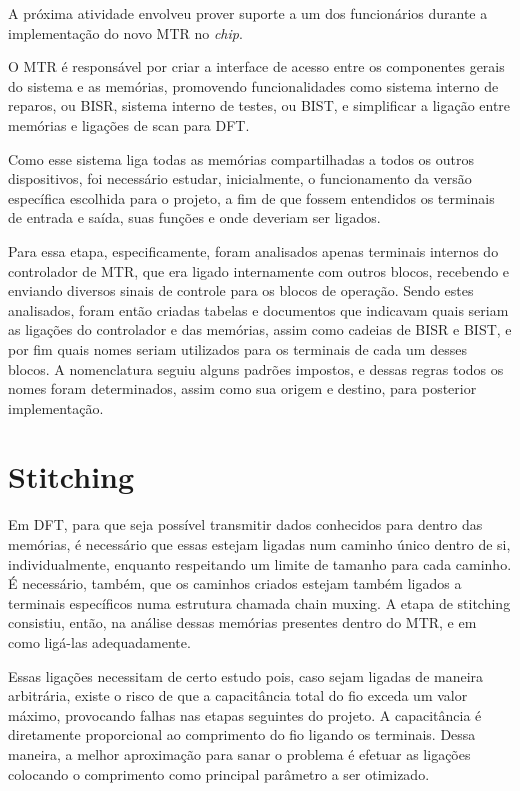 \documentclass[
	12pt,				%
    oneside,			%
	a4paper,			%
	english,			%
	french,				%
	spanish,			%
	brazil				%
	]{abntex2}
\begin{document}
A próxima atividade envolveu prover suporte a um dos funcionários durante a implementação do novo MTR no \textit{chip}.

O MTR é responsável por criar a interface de acesso entre os componentes gerais do sistema e as memórias, promovendo funcionalidades como sistema interno de reparos, ou BISR, sistema interno de testes, ou BIST, e simplificar a ligação entre memórias e ligações de scan para DFT.

Como esse sistema liga todas as memórias compartilhadas a todos os outros dispositivos, foi necessário estudar, inicialmente, o funcionamento da versão específica escolhida para o projeto, a fim de que fossem entendidos os terminais de entrada e saída, suas funções e onde deveriam ser ligados.

Para essa etapa, especificamente, foram analisados apenas terminais internos do controlador de MTR, que era ligado internamente com outros blocos, recebendo e enviando diversos sinais de controle para os blocos de operação. Sendo estes analisados, foram então criadas tabelas e documentos que indicavam quais seriam as ligações do controlador e das memórias, assim como cadeias de BISR e BIST, e por fim quais nomes seriam utilizados para os terminais de cada um desses blocos. A nomenclatura seguiu alguns padrões impostos, e dessas regras todos os nomes foram determinados, assim como sua origem e destino, para posterior implementação.


\section{Stitching}

Em DFT, para que seja possível transmitir dados conhecidos para dentro das memórias, é necessário que essas estejam ligadas num caminho único dentro de si, individualmente, enquanto respeitando um limite de tamanho para cada caminho. É necessário, também, que os caminhos criados estejam também ligados a terminais específicos numa estrutura chamada chain muxing. A etapa de stitching consistiu, então, na análise dessas memórias presentes dentro do MTR, e em como ligá-las adequadamente.

Essas ligações necessitam de certo estudo pois, caso sejam ligadas de maneira arbitrária, existe o risco de que a capacitância total do fio exceda um valor máximo, provocando falhas nas etapas seguintes do projeto. A capacitância é diretamente proporcional ao comprimento do fio ligando os terminais. Dessa maneira, a melhor aproximação para sanar o problema é efetuar as ligações colocando o comprimento como principal parâmetro a ser otimizado.
\end{document}
